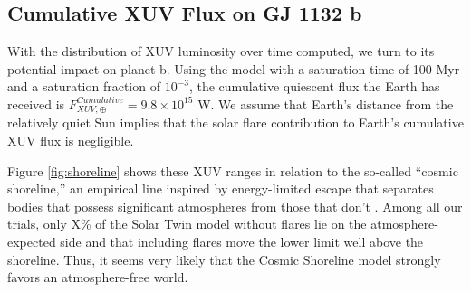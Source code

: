 \documentclass[preprint]{aastex631}
\def\tess{{\it TESS}\xspace}
\begin{document}



\subsection{Cumulative XUV Flux on GJ 1132 b}

With the distribution of XUV luminosity over time computed, we turn to its potential impact on planet b. Using the \cite{Ribas05} model with a saturation time of 100 Myr and a saturation fraction of $10^{-3}$, the cumulative quiescent flux the Earth has received is $F_{XUV,\oplus}^{Cumulative} = 9.8 \times 10^{15}$ W. We assume that Earth's distance from the relatively quiet Sun implies that the solar flare contribution to Earth's cumulative XUV flux is negligible.



Figure \ref{fig:shoreline} shows these XUV ranges in relation to the so-called ``cosmic shoreline,'' an empirical line inspired by energy-limited escape that separates bodies that possess significant atmospheres from those that don't \citep{ZahnleCatling17}. Among all our trials, only X\% of the Solar Twin model without flares lie on the atmosphere-expected side and that including flares move the lower limit well above the shoreline. Thus, it seems very likely that the Cosmic Shoreline model strongly favors an atmosphere-free world.
\end{document}

